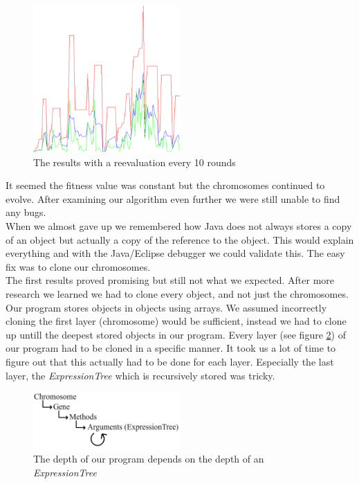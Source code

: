 \documentclass[a4paper,10pt]{article}
\begin{document}
\begin{figure}[h!]
    \centering
    \includegraphics[width=0.5\textwidth]{result_2}
    \caption{The results with a reevaluation every 10 rounds}
    \label{fig:result_2}
\end{figure}

It seemed the fitness value was constant but the chromosomes continued to evolve. After examining our algorithm even further we were still unable to find any bugs.\\
When we almost gave up we remembered how Java does not always stores a copy of an object but actually a copy of the reference to the object. This would explain everything and with the Java/Eclipse debugger we could validate this. The easy fix was to clone our chromosomes.\\

The first results proved promising but still not what we expected. After more research we learned we had to clone every object, and not just the chromosomes. Our program stores objects in objects using arrays. We assumed incorrectly cloning the first layer (chromosome) would be sufficient, instead we had to clone up untill the deepest stored objects in our program. Every layer (see figure \ref{fig:layers}) of our program had to be cloned in a specific manner. It took us a lot of time to figure out that this actually had to be done for each layer. Especially the last layer, the \textit{ExpressionTree} which is recursively stored was tricky.\\

\begin{figure}[h!]
    \centering
    \includegraphics[width=0.5\textwidth]{layers}
    \caption{The depth of our program depends on the depth of an \textit{ExpressionTree}}
    \label{fig:layers}
\end{figure} 
\end{document}
